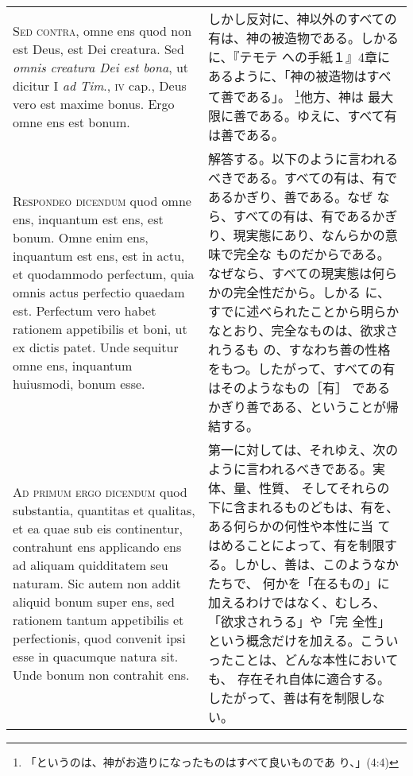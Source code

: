 \documentclass[10pt]{jsarticle} %
\begin{document}
\begin{longtable}{p{21em}p{21em}}
\\

{\scshape Sed contra}, omne ens quod non est Deus, est Dei creatura. Sed
 {\itshape omnis creatura Dei est bona}, ut dicitur I {\itshape ad
 Tim}., {\scshape iv} cap., Deus vero est maxime bonus. Ergo omne ens
 est bonum.

&

しかし反対に、神以外のすべての有は、神の被造物である。しかるに、『テモテ
 への手紙１』4章にあるように、「神の被造物はすべて善である」。
 \footnote{「というのは、神がお造りになったものはすべて良いものであ
 り、」(4:4)}他方、神は
 最大限に善である。ゆえに、すべて有は善である。

\\

{\scshape Respondeo dicendum} quod omne ens, inquantum est ens, est
 bonum. Omne enim ens, inquantum est ens, est in actu, et quodammodo
 perfectum, quia omnis actus perfectio quaedam est. Perfectum vero habet
 rationem appetibilis et boni, ut ex dictis patet. Unde sequitur omne
 ens, inquantum huiusmodi, bonum esse.

&

解答する。以下のように言われるべきである。すべての有は、有であるかぎり、善である。なぜ
 なら、すべての有は、有であるかぎり、現実態にあり、なんらかの意味で完全な
 ものだからである。なぜなら、すべての現実態は何らかの完全性だから。しかる
 に、すでに述べられたことから明らかなとおり、完全なものは、欲求されうるも
 の、すなわち善の性格をもつ。したがって、すべての有はそのようなもの［有］
 であるかぎり善である、ということが帰結する。

\\


{\scshape Ad primum ergo dicendum} quod substantia, quantitas et qualitas, et
 ea quae sub eis continentur, contrahunt ens applicando ens ad aliquam
 quidditatem seu naturam. Sic autem non addit aliquid bonum super ens,
 sed rationem tantum appetibilis et perfectionis, quod convenit ipsi
 esse in quacumque natura sit. Unde bonum non contrahit ens.

&

第一に対しては、それゆえ、次のように言われるべきである。実体、量、性質、
 そしてそれらの下に含まれるものどもは、有を、ある何らかの何性や本性に当
 てはめることによって、有を制限する。しかし、善は、このようなかたちで、
 何かを「在るもの」に加えるわけではなく、むしろ、「欲求されうる」や「完
 全性」という概念だけを加える。こういったことは、どんな本性においても、
 存在それ自体に適合する。したがって、善は有を制限しない。


\end{longtable}
\end{document}
